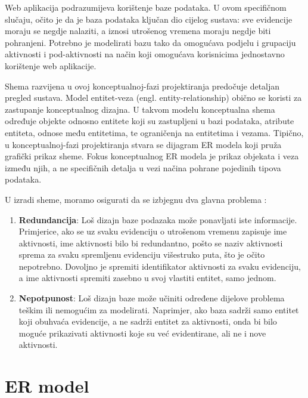 \documentclass[times, utf8, zavrsni]{fer}
\begin{document}
Web aplikacija podrazumijeva korištenje baze podataka. U ovom specifičnom slučaju, očito je da je baza podataka ključan dio cijelog sustava: sve evidencije moraju se negdje nalaziti, a iznosi utrošenog vremena moraju negdje biti pohranjeni. Potrebno je modelirati bazu tako da omogućava podjelu i grupaciju aktivnosti i pod-aktivnosti na način koji omogućava korisnicima jednostavno korištenje web aplikacije.

Shema razvijena u ovoj konceptualnoj-fazi projektiranja predočuje detaljan pregled sustava. Model entitet-veza (engl. entity-relationship) obično se koristi za zastupanje konceptualnog dizajna. U takvom modelu konceptualna shema određuje objekte odnosno entitete koji su zastupljeni u bazi podataka, atribute entiteta, odnose među entitetima, te ograničenja na entitetima i vezama. Tipično, u konceptualnoj-fazi projektiranja stvara se dijagram ER modela koji pruža grafički prikaz sheme. Fokus konceptualnog ER modela je prikaz objekata i veza između njih, a ne specifičnih detalja u vezi načina pohrane pojedinih tipova podataka.

U izradi sheme, moramo osigurati da se izbjegnu dva glavna problema \cite{dbsyscon}:
\begin{enumerate}
\item \textbf{Redundancija}: Loš dizajn baze podazaka može ponavljati iste informacije. Primjerice, ako se uz svaku evidenciju o utrošenom vremenu zapisuje ime aktivnosti, ime aktivnosti bilo bi redundantno, pošto se naziv aktivnosti sprema za svaku spremljenu evidenciju višestruko puta, što je očito nepotrebno. Dovoljno je spremiti identifikator aktivnosti za svaku evidenciju, a ime aktivnosti spremiti zasebno u svoj vlastiti entitet, samo jednom.
\item \textbf{Nepotpunost}: Loš dizajn baze može učiniti određene dijelove problema teškim ili nemogućim za modelirati. Naprimjer, ako baza sadrži samo entitet koji obuhvaća evidencije, a ne sadrži entitet za aktivnosti, onda bi bilo moguće prikazivati aktivnosti koje su već evidentirane, ali ne i nove aktivnosti.
\end{enumerate}

\section{ER model}
\end{document}
